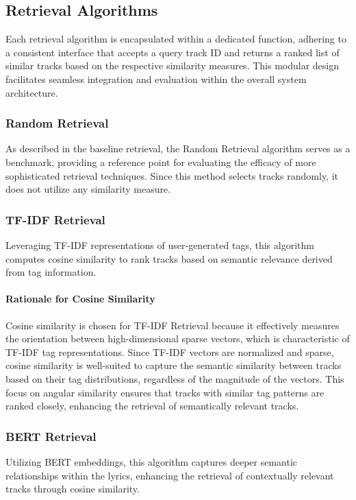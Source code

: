 \documentclass[sigconf]{acmart}
\begin{document}
\subsection{Retrieval Algorithms}
\label{subsec:retrieval_algorithms}

Each retrieval algorithm is encapsulated within a dedicated function, adhering to a consistent interface that accepts a query track ID and returns a ranked list of similar tracks based on the respective similarity measures. This modular design facilitates seamless integration and evaluation within the overall system architecture.

\subsubsection{Random Retrieval}
As described in the baseline retrieval, the Random Retrieval algorithm serves as a benchmark, providing a reference point for evaluating the efficacy of more sophisticated retrieval techniques. Since this method selects tracks randomly, it does not utilize any similarity measure.

\subsubsection{TF-IDF Retrieval}
Leveraging TF-IDF representations of user-generated tags, this algorithm computes cosine similarity to rank tracks based on semantic relevance derived from tag information.

\paragraph{Rationale for Cosine Similarity}
Cosine similarity is chosen for TF-IDF Retrieval because it effectively measures the orientation between high-dimensional sparse vectors, which is characteristic of TF-IDF tag representations. Since TF-IDF vectors are normalized and sparse, cosine similarity is well-suited to capture the semantic similarity between tracks based on their tag distributions, regardless of the magnitude of the vectors. This focus on angular similarity ensures that tracks with similar tag patterns are ranked closely, enhancing the retrieval of semantically relevant tracks.

\subsubsection{BERT Retrieval}
Utilizing BERT embeddings, this algorithm captures deeper semantic relationships within the lyrics, enhancing the retrieval of contextually relevant tracks through cosine similarity.
\end{document}
